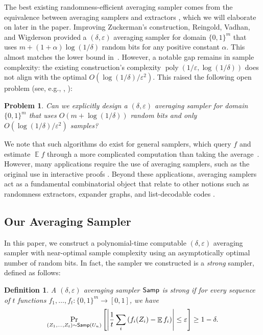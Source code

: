 \documentclass[10pt,a4paper]{article}
\newtheorem{problem}{Problem}
\newtheorem{definition}[theorem]{Definition}
\DeclareMathOperator*{\E}{\mathbb{E}}
\DeclareMathOperator*{\poly}{poly}
\newcommand{\eps}{\varepsilon}
\newcommand{\1}{\mathbbm{1}}
\newcommand{\abs}[1]{\left|#1\right| }
\newcommand{\tuple}[1]{\left(#1\right)}
\newcommand{\zo}{\{0, 1\}}
\newcommand{\Smp}{\textup{\textsf{Samp}}}
\begin{document}
The best existing randomness-efficient averaging sampler comes from the equivalence between averaging samplers and extractors \cite{zuckerman1997randomness}, which we will elaborate on later in the paper. Improving Zuckerman's construction, Reingold, Vadhan, and Wigderson \cite{reingold2000entropy} provided a $(\delta, \eps)$ averaging sampler for domain $\zo^{m}$ that uses $m + (1 + \alpha)\log (1 / \delta)$ random bits for any positive constant $\alpha$. This almost matches the lower bound in~\cite{CEG95}. However, a notable gap remains in sample complexity: the existing construction's complexity $\poly(1 / \eps, \log (1 / \delta))$ does not align with the optimal $O( \log (1 / \delta)  / \eps^2)$. This raised the following open problem (see, e.g., \cite[Open Problem 4.24]{vadhan2012pseudorandomness}, \cite[Section 6]{oded_survey}):
\begin{problem}
  \label{problem1}
  {Can we explicitly design a $(\delta, \eps)$ averaging sampler for domain $\zo^m$ that uses $O(m + \log (1 / \delta))$ random bits and only $O( \log (1 / \delta)  / \eps^2)$ samples?}
\end{problem}


We note that such algorithms do exist for general samplers, which query $f$ and estimate $\E f$ through a more complicated  computation than taking the average~\cite{BGG93}.  
However, many applications require the use of averaging samplers, such as the original use in interactive proofs \cite{bellare1994randomness}. 
Beyond these applications, averaging samplers act as a fundamental combinatorial object that relate to other notions such as randomness extractors, expander graphs, and list-decodable codes \cite{zuckerman1997randomness, vadhan2007unified}.

\subsection{Our Averaging Sampler} 
In this paper, we construct a polynomial-time computable $(\delta, \eps)$ averaging sampler with near-optimal sample complexity using an asymptotically optimal number of random bits.  In fact, the sampler we constructed is a \emph{strong} sampler, defined as follows:

\begin{definition}
    A $(\delta, \varepsilon)$ averaging sampler $\Smp$ is \emph{strong} if
    for every sequence of $t$ functions $f_1, \dots, f_t: \zo^m \to [0,1]$, we have
    \[
    \Pr_{(Z_1, \dots, Z_t) \sim \Smp(U_n)}
    \left[ \abs{\frac{1}{t}  \sum_i \tuple{f_i(Z_i) - \E f_i}} \leq \varepsilon \right]
    \geq 1 - \delta.
    \]
\end{definition}
\end{document}

